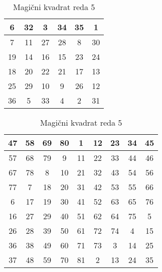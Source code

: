 \documentclass[a4paper,12pt]{article}
\begin{document}
\begin{table}[h]
   \centering
   \caption{Magični kvadrat reda 5}
   \label{table:mag6}
   \begin{tabular}{|c|c|c|c|c|c|}
   \hline  
   6 & 32 &  3 & 34 & 35 &  1 \\
   \hline
   7 & 11 & 27 & 28 &  8 & 30 \\
   \hline
   19 & 14 & 16 & 15 & 23 & 24 \\
   \hline
   18 & 20 & 22 & 21 & 17 & 13 \\
   \hline
   25 & 29 & 10 &  9 & 26 & 12 \\
   \hline
   36 &  5 & 33 &  4 &  2 & 31 \\
   \hline  
   \end{tabular}

\end{table}
\begin{table}[h]
   \centering
   \caption{Magični kvadrat reda 5}
   \label{table:mag9}
   \begin{tabular}{|c|c|c|c|c|c|c|c|c|}
   \hline  
   47 & 58 & 69 & 80 &  1 & 12 & 23 & 34 & 45 \\
   \hline
   57 & 68 & 79 &  9 & 11 & 22 & 33 & 44 & 46 \\
   \hline
   67 & 78 &  8 & 10 & 21 & 32 & 43 & 54 & 56 \\
   \hline
   77 &  7 & 18 & 20 & 31 & 42 & 53 & 55 & 66 \\
   \hline
   6 & 17 & 19 & 30 & 41 & 52 & 63 & 65 & 76 \\
   \hline
   16 & 27 & 29 & 40 & 51 & 62 & 64 & 75 &  5 \\
   \hline
   26 & 28 & 39 & 50 & 61 & 72 & 74 &  4 & 15 \\
   \hline
   36 & 38 & 49 & 60 & 71 & 73 &  3 & 14 & 25 \\
   \hline
   37 & 48 & 59 & 70 & 81 &  2 & 13 & 24 & 35 \\
   \hline

   \end{tabular}

\end{table}
\end{document}
